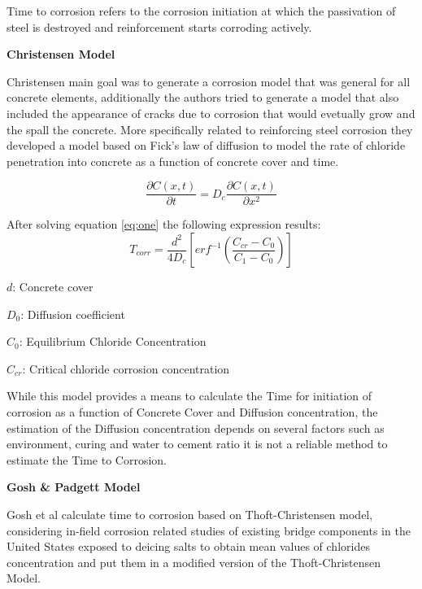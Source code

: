 Time to corrosion refers to the corrosion initiation at which the passivation of steel is destroyed and reinforcement starts corroding actively.
\newline

\textbf{Christensen Model}
\newline

Christensen \cite{Thoft-Christensen} main goal was to generate a corrosion model that was general for all concrete elements, additionally the authors tried to generate a model that also included the appearance of cracks due to corrosion that would evetually grow and the spall the concrete. More specifically related to reinforcing steel corrosion they developed a model based on Fick's law of diffusion to model the rate of chloride penetration into concrete as a function of concrete cover and time. 

\begin{equation}
	\frac{\partial C(x,t)}{\partial t} = D_c \frac{\partial C(x,t)}{\partial x^2}
	\label{eq:one}
\end{equation}

After solving equation \ref{eq:one} the following expression results:
\begin{equation}
  T_{corr}=\frac{d^2}{4D_c} \left[erf^{-1}\left(\frac{C_{cr}-C_{0}}{C_1 -C_0}\right)\right]
  \label{eq:two}
\end{equation} 

$d$: Concrete cover

$D_0$: Diffusion coefficient

$C_{0}$: Equilibrium Chloride Concentration

$C_{cr}$: Critical chloride corrosion concentration
\newline

While this model provides a means to calculate the Time for initiation of corrosion as a function of Concrete Cover and Diffusion concentration, the estimation of the Diffusion concentration depends on several factors such as environment, curing and water to cement ratio it is not a reliable method to estimate the Time to Corrosion.
\newline

\textbf{Gosh \& Padgett Model}
\newline

Gosh et al calculate time to corrosion based on Thoft-Christensen model, considering in-field corrosion related studies of existing bridge components in the United States exposed to deicing salts to obtain mean values of chlorides concentration and put them in a modified version of the Thoft-Christensen Model.

